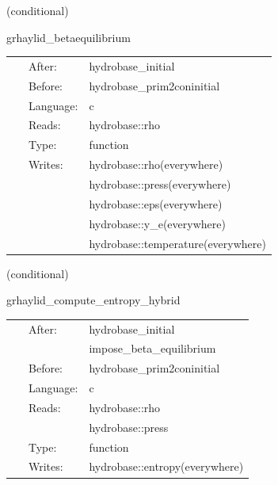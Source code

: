 \vspace{5mm}

   (conditional) 

\hspace{5mm} grhaylid\_betaequilibrium 

\hspace{5mm}{\it set beta-equilibrium primitives with a complete atmosphere density reset } 


\hspace{5mm}

 \begin{tabular*}{160mm}{cll} 
~ & After:  & hydrobase\_initial \\ 
~ & Before:  & hydrobase\_prim2coninitial \\ 
~ & Language:  & c \\ 
~ & Reads:  & hydrobase::rho \\ 
~ & Type:  & function \\ 
~ & Writes:  & hydrobase::rho(everywhere) \\ 
~& ~ &hydrobase::press(everywhere)\\ 
~& ~ &hydrobase::eps(everywhere)\\ 
~& ~ &hydrobase::y\_e(everywhere)\\ 
~& ~ &hydrobase::temperature(everywhere)\\ 
\end{tabular*} 


\vspace{5mm}

   (conditional) 

\hspace{5mm} grhaylid\_compute\_entropy\_hybrid 

\hspace{5mm}{\it computes entropy from density and pressure using simple/hybrid native proxy } 


\hspace{5mm}

 \begin{tabular*}{160mm}{cll} 
~ & After:  & hydrobase\_initial \\ 
~& ~ &impose\_beta\_equilibrium\\ 
~ & Before:  & hydrobase\_prim2coninitial \\ 
~ & Language:  & c \\ 
~ & Reads:  & hydrobase::rho \\ 
~& ~ &hydrobase::press\\ 
~ & Type:  & function \\ 
~ & Writes:  & hydrobase::entropy(everywhere) \\ 
\end{tabular*} 


